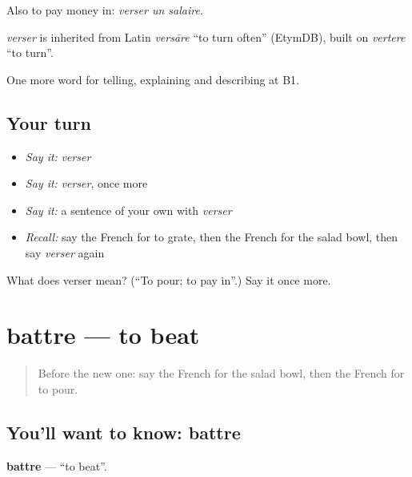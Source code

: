 Also to pay money in: \emph{verser un salaire}.

\begin{cousinweb}
\emph{verser} is inherited from Latin \emph{versāre} \textquotedblleft{}to turn often\textquotedblright{} (EtymDB), built on \emph{vertere} \textquotedblleft{}to turn\textquotedblright{}.
\end{cousinweb}

\begin{grammarlens}[title={What you've built}]
One more word for telling, explaining and describing at B1.
\end{grammarlens}

\subsection*{Your turn}
\begin{itemize}
\raggedright
  \item \emph{Say it:} \emph{verser}
  \item \emph{Say it:} \emph{verser}, once more
  \item \emph{Say it:} a sentence of your own with \emph{verser}
  \item \emph{Recall:} say the French for to grate, then the French for the salad bowl, then say \emph{verser} again
\end{itemize}

\begin{tcolorbox}[breakable,colback=teal!4,colframe=teal!35!black,title={Before you move on}]
What does verser mean? (\textquotedblleft{}To pour; to pay in\textquotedblright{}.) Say it once more.
\end{tcolorbox}
\section[battre]{battre — to beat}

\label{lesson:FR-C329-battre}



\begin{quote}
Before the new one: say the French for the salad bowl, then the French for to pour.
\end{quote}

\subsection*{You'll want to know: battre}
\textbf{battre} — \textquotedblleft{}to beat\textquotedblright{}.

